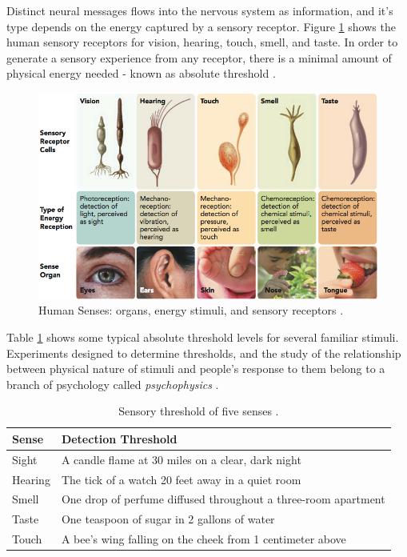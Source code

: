 Distinct neural messages flows into the nervous system as information, and it's type depends on the energy captured by a sensory receptor. Figure \ref{fig:senses} shows the human sensory receptors for vision, hearing, touch, smell, and taste. In order to generate a sensory experience from any receptor, there is a minimal amount of physical energy needed - known as absolute threshold \cite{Zimbardo2012}.

\begin{figure}[h]
	\centering
	\includegraphics[width=0.95\linewidth]{__Images/02/senses.png}
	\caption[Human Senses: organs, energy stimuli, and sensory receptors]{Human Senses: organs, energy stimuli, and sensory receptors \cite{King2012}.}
	\label{fig:senses}
\end{figure}

Table \ref{table:threshold} shows some typical absolute threshold levels for several familiar stimuli. Experiments designed to determine thresholds, and the study of the relationship between physical nature of stimuli and people's response to them belong to a branch of psychology called {\it psychophysics} \cite{Lemma2005}.

\begin{table}[h]
	\caption[Sensory threshold of five senses]{Sensory threshold of five senses \cite{Zimbardo2012}.}
	\begin{center}
	\begin{tabular}{l l}
	
		\textbf{Sense}	&	\textbf{Detection Threshold} \\
		\hline
		Sight			&	A candle flame at 30 miles on a clear, dark night\\
		Hearing			&	The tick of a watch 20 feet away in a quiet room\\
		Smell			&	One drop of perfume diffused throughout a three-room apartment\\
		Taste			&	One teaspoon of sugar in 2 gallons of water\\
		Touch			&	A bee's wing falling on the cheek from 1 centimeter above\\
	\end{tabular}
	\end{center}
	\label{table:threshold}
\end{table}

